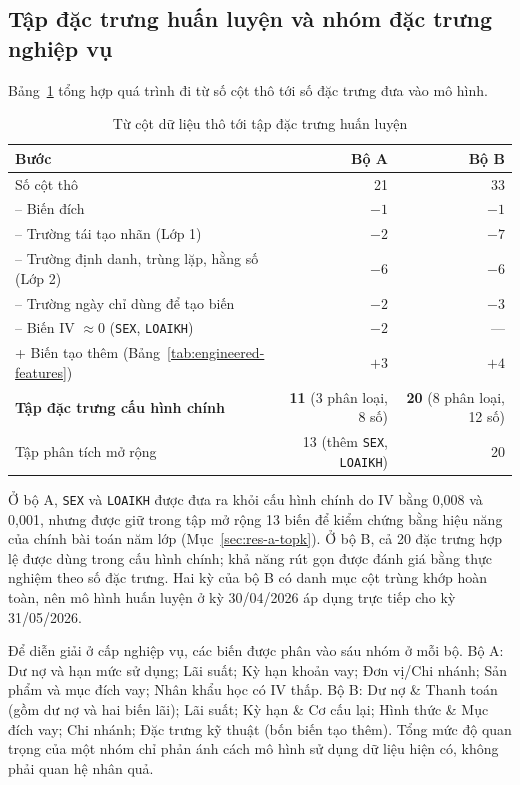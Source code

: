 \subsection{Tập đặc trưng huấn luyện và nhóm đặc trưng nghiệp vụ}
\label{sec:pool-a}

Bảng~\ref{tab:feature-count} tổng hợp quá trình đi từ số cột thô tới số đặc trưng đưa vào mô hình.

\begin{table}[H]
\centering
\caption{Từ cột dữ liệu thô tới tập đặc trưng huấn luyện}
\label{tab:feature-count}
\begin{tabular}{|l|r|r|}
\hline
Bước & Bộ A & Bộ B\\
\hline
Số cột thô & 21 & 33\\
-- Biến đích & $-1$ & $-1$\\
-- Trường tái tạo nhãn (Lớp 1) & $-2$ & $-7$\\
-- Trường định danh, trùng lặp, hằng số (Lớp 2) & $-6$ & $-6$\\
-- Trường ngày chỉ dùng để tạo biến & $-2$ & $-3$\\
-- Biến IV $\approx0$ (\texttt{SEX}, \texttt{LOAIKH}) & $-2$ & ---\\
+ Biến tạo thêm (Bảng~\ref{tab:engineered-features}) & $+3$ & $+4$\\
\hline
\textbf{Tập đặc trưng cấu hình chính} & \textbf{11} (3 phân loại, 8 số) & \textbf{20} (8 phân loại, 12 số)\\
Tập phân tích mở rộng & 13 (thêm \texttt{SEX}, \texttt{LOAIKH}) & 20\\
\hline
\end{tabular}
\end{table}

Ở bộ A, \texttt{SEX} và \texttt{LOAIKH} được đưa ra khỏi cấu hình chính do IV bằng 0,008 và 0,001, nhưng được giữ trong tập mở rộng 13 biến để kiểm chứng bằng hiệu năng của chính bài toán năm lớp (Mục~\ref{sec:res-a-topk}). Ở bộ B, cả 20 đặc trưng hợp lệ được dùng trong cấu hình chính; khả năng rút gọn được đánh giá bằng thực nghiệm theo số đặc trưng. Hai kỳ của bộ B có danh mục cột trùng khớp hoàn toàn, nên mô hình huấn luyện ở kỳ 30/04/2026 áp dụng trực tiếp cho kỳ 31/05/2026.

Để diễn giải ở cấp nghiệp vụ, các biến được phân vào sáu nhóm ở mỗi bộ. Bộ A: Dư nợ và hạn mức sử dụng; Lãi suất; Kỳ hạn khoản vay; Đơn vị/Chi nhánh; Sản phẩm và mục đích vay; Nhân khẩu học có IV thấp. Bộ B: Dư nợ \& Thanh toán (gồm dư nợ và hai biến lãi); Lãi suất; Kỳ hạn \& Cơ cấu lại; Hình thức \& Mục đích vay; Chi nhánh; Đặc trưng kỹ thuật (bốn biến tạo thêm). Tổng mức độ quan trọng của một nhóm chỉ phản ánh cách mô hình sử dụng dữ liệu hiện có, không phải quan hệ nhân quả.

